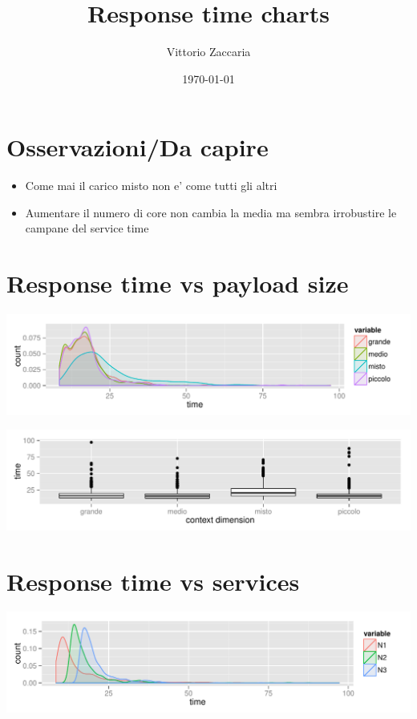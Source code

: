 \documentclass[12pt,a4]{article}
\author{Vittorio Zaccaria}
\date{\today}
\title{Response time charts}
\begin{document}
\maketitle
\tableofcontents


\section{Osservazioni/Da capire}
\label{sec-1}

\begin{itemize}
\item Come mai il carico misto non e' come tutti gli altri
\item Aumentare il numero di core non cambia la media ma sembra irrobustire le campane del service time
\end{itemize}

\section{Response time vs payload size}
\label{sec-2}

\includegraphics[width=.9\linewidth]{figures/response-time-vs-payload.pdf}

\includegraphics[width=.9\linewidth]{figures/response-time-vs-payload-boxplot.pdf}

\section{Response time vs services}
\label{sec-3}

\includegraphics[width=.9\linewidth]{figures/response-time-vs-numsrvc.pdf}
\end{document}
